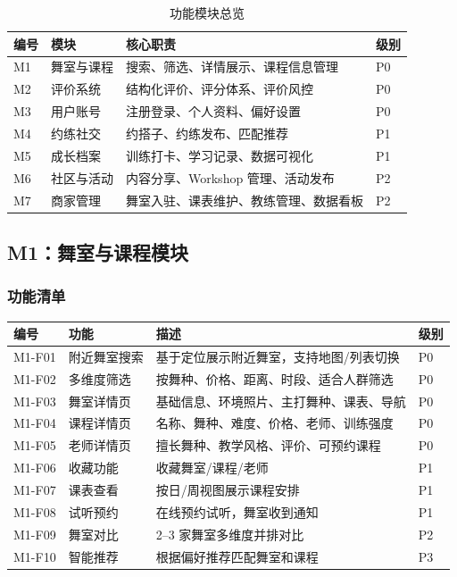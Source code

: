\documentclass[12pt,a4paper]{ctexart}
\begin{document}
\begin{table}[H]
\centering
\caption{功能模块总览}
\begin{tabularx}{\textwidth}{C{1cm}L{3cm}X C{1cm}}
\toprule
\textbf{编号} & \textbf{模块} & \textbf{核心职责} & \textbf{级别} \\
\midrule
M1 & 舞室与课程 & 搜索、筛选、详情展示、课程信息管理 & P0 \\
M2 & 评价系统 & 结构化评价、评分体系、评价风控 & P0 \\
M3 & 用户账号 & 注册登录、个人资料、偏好设置 & P0 \\
M4 & 约练社交 & 约搭子、约练发布、匹配推荐 & P1 \\
M5 & 成长档案 & 训练打卡、学习记录、数据可视化 & P1 \\
M6 & 社区与活动 & 内容分享、Workshop 管理、活动发布 & P2 \\
M7 & 商家管理 & 舞室入驻、课表维护、教练管理、数据看板 & P2 \\
\bottomrule
\end{tabularx}
\end{table}

\subsection{M1：舞室与课程模块}

\subsubsection{功能清单}

\begin{table}[H]
\centering
\begin{tabularx}{\textwidth}{C{1.5cm}L{2.5cm}X C{0.8cm}}
\toprule
\textbf{编号} & \textbf{功能} & \textbf{描述} & \textbf{级别} \\
\midrule
M1-F01 & 附近舞室搜索 & 基于定位展示附近舞室，支持地图/列表切换 & P0 \\
M1-F02 & 多维度筛选 & 按舞种、价格、距离、时段、适合人群筛选 & P0 \\
M1-F03 & 舞室详情页 & 基础信息、环境照片、主打舞种、课表、导航 & P0 \\
M1-F04 & 课程详情页 & 名称、舞种、难度、价格、老师、训练强度 & P0 \\
M1-F05 & 老师详情页 & 擅长舞种、教学风格、评价、可预约课程 & P0 \\
M1-F06 & 收藏功能 & 收藏舞室/课程/老师 & P1 \\
M1-F07 & 课表查看 & 按日/周视图展示课程安排 & P1 \\
M1-F08 & 试听预约 & 在线预约试听，舞室收到通知 & P1 \\
M1-F09 & 舞室对比 & 2--3 家舞室多维度并排对比 & P2 \\
M1-F10 & 智能推荐 & 根据偏好推荐匹配舞室和课程 & P3 \\
\bottomrule
\end{tabularx}
\end{table}
\end{document}
